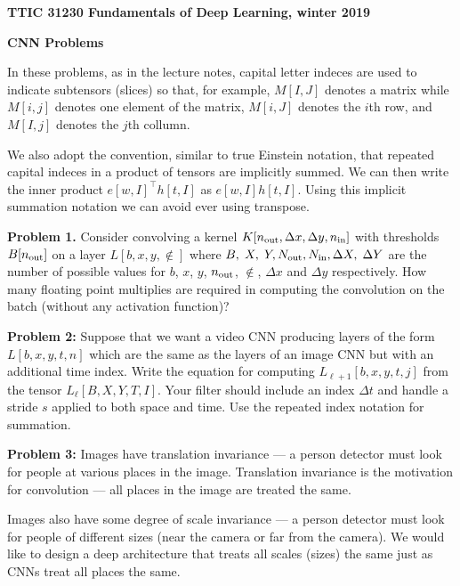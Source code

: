 \documentclass{article}
\newcommand{\solution}[1]{\bigskip {\color{red} {\bf Solution}: #1}}
\begin{document}
\centerline{\bf TTIC 31230 Fundamentals of Deep Learning, winter 2019}

\medskip
\centerline{\bf CNN Problems}

In these problems, as in the lecture notes, capital letter indeces are used to indicate subtensors (slices) so that, for example,  $M[I,J]$ denotes a matrix
while $M[i,j]$ denotes one element of the matrix, $M[i,J]$ denotes the $i$th row, and $M[I,j]$ denotes the $j$th collumn.

\medskip
We also adopt the convention, similar to true Einstein notation, that repeated capital indeces in a product of tensors are implicitly summed.  We can then write
the inner product $e[w,I]^\top h[t,I]$ as $e[w,I]h[t,I]$.  Using this implicit summation notation we can avoid ever using transpose.

\bigskip
{\bf Problem 1.}  Consider convolving a kernel $K[n_{\mathrm{out}},\Delta x, \Delta y,n_{\mathrm{in}}]$  with thresholds $B[n_{\mathrm{out}}]$ on a layer $L[b,x,y,\nin]$ where $B,\;X,\;Y,N_{\mathrm{out}}, N_{\mathrm{in}},\Delta X,\;\Delta Y$
are the number of possible values for $b$, $x$, $y$, $n_{\mathrm{out}}$, $\nin$, $\Delta x$ and $\Delta y$ respectively.
How many floating point multiplies are required
in computing the convolution on the batch (without any activation function)?

\solution{$$BXY\;\Delta X\;\Delta Y \;\Nout \;\Nin$$}

\bigskip
{\bf Problem 2:} Suppose that we want a video CNN producing layers of the form $L[b,x,y,t,n]$ which are the same as the layers of an image CNN but with an additional time index.
Write the equation for computing $L_{\ell+1}[b,x,y,t,j]$ from the tensor $L_\ell[B,X,Y,T,I]$.  Your filter should include an index $\Delta t$ and handle a stride $s$ applied
to both space and time. Use the repeated index notation for summation.

\solution{
  $$L_{\ell + 1}[b,x,y,t,\nout] = \sigma(K_{\ell+1}[\nout \Delta X, \Delta Y, \Delta T, \Nin] L_\ell[b, sx+ \Delta X, sy + \Delta Y, st + \Delta T, \Nin]- B[\nout])$$
  }

\bigskip
{\bf Problem 3:} Images have translation invariance --- a person detector must look for people at
various places in the image.  Translation invariance is the motivation for convolution --- all
places in the image are treated the same.

\medskip
Images also have some degree of scale invariance --- a person detector must look for people of different sizes
(near the camera or far from the camera).  We would like to design a deep architecture that treats all scales (sizes) the same just as CNNs
treat all places the same.
\end{document}
